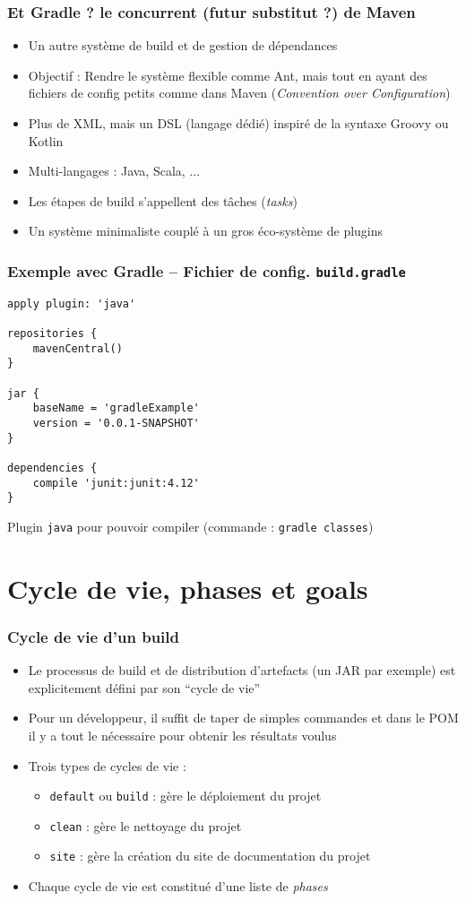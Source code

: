 \documentclass{beamer}
\begin{document}
\begin{frame}[fragile]
  \frametitle{Et Gradle ? le concurrent (futur substitut ?) de Maven}
\begin{itemize}
\item Un autre système de build et de gestion de dépendances
\item Objectif : Rendre le système flexible comme Ant, mais tout en
  ayant des fichiers de config petits comme dans Maven (\textit{Convention
  over Configuration})
\item Plus de XML, mais un DSL (langage dédié) inspiré de la syntaxe
  Groovy ou Kotlin
\item Multi-langages : Java, Scala, ...
\item Les étapes de build s'appellent des tâches (\textit{tasks})
\item Un système minimaliste couplé à un gros éco-système de plugins
\end{itemize}
\end{frame}

\begin{frame}[fragile]
  \frametitle{Exemple avec Gradle -- Fichier de config. \texttt{build.gradle}}
\begin{lstlisting}[basicstyle=\scriptsize]
apply plugin: 'java'
 
repositories {
    mavenCentral()
}
 
jar {
    baseName = 'gradleExample'
    version = '0.0.1-SNAPSHOT'
}
 
dependencies {
    compile 'junit:junit:4.12'
}
\end{lstlisting}
Plugin \texttt{java} pour pouvoir compiler (commande : \texttt{gradle
  classes})
\end{frame}

\section{Cycle de vie, phases et goals}
\begin{frame}[fragile]
  \frametitle{Cycle de vie d'un build}
\begin{itemize}
\item Le processus de build et de distribution d'artefacts (un JAR par
  exemple) est explicitement défini par son ``cycle de vie''
\item Pour un développeur, il suffit de taper de simples commandes et
  dans le POM il y a tout le nécessaire pour obtenir les résultats voulus
\item Trois types de cycles de vie :
  \begin{itemize}
  \item \texttt{default} ou \texttt{build} : gère le déploiement du
    projet
  \item \texttt{clean} : gère le nettoyage du projet
  \item \texttt{site} : gère la création du site de documentation du projet
  \end{itemize}
\item Chaque cycle de vie est constitué d'une liste de \textit{phases}
\end{itemize}
\end{frame}
\end{document}
